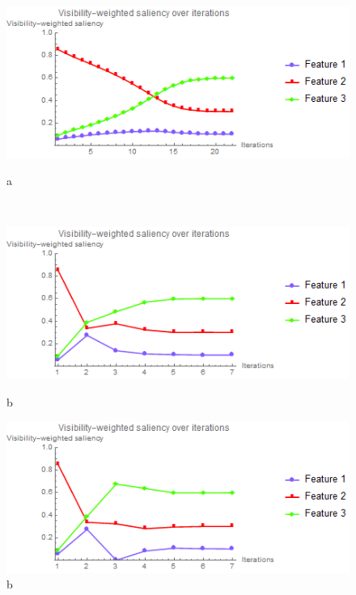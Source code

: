 \begin{figure}
	\centering
	\begin{minipage}{.3\textwidth}
		\includegraphics[width=1\linewidth]{images/saliency_fixed}
		\caption{a}	
	\end{minipage}~
	\begin{minipage}{.3\textwidth}
		\includegraphics[width=1\linewidth]{images/saliency_linesearch}
		\caption{b}	
	\end{minipage}
	\begin{minipage}{.3\textwidth}
		\includegraphics[width=1\linewidth]{images/saliency_parallelsearch}
		\caption{b}	
	\end{minipage}
	\label{fig:nucleon_saliency}
\end{figure}

